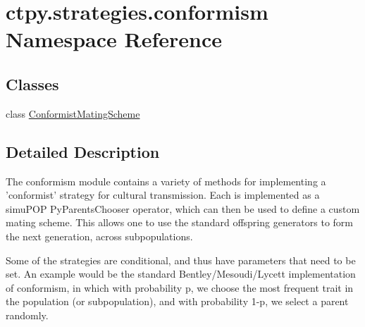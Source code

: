 \hypertarget{namespacectpy_1_1strategies_1_1conformism}{\section{ctpy.\-strategies.\-conformism Namespace Reference}
\label{namespacectpy_1_1strategies_1_1conformism}
}
\subsection*{Classes}
\begin{DoxyCompactItemize}
\item 
class \hyperlink{classctpy_1_1strategies_1_1conformism_1_1_conformist_mating_scheme}{Conformist\-Mating\-Scheme}
\end{DoxyCompactItemize}


\subsection{Detailed Description}
\begin{DoxyVerb}The conformism module contains a variety of methods for implementing a 'conformist'
strategy for cultural transmission.  Each is implemented as a simuPOP PyParentsChooser
operator, which can then be used to define a custom mating scheme.  This allows one to
use the standard offspring generators to form the next generation, across subpopulations.

Some of the strategies are conditional, and thus have parameters that need to be set.  An
example would be the standard Bentley/Mesoudi/Lycett implementation of conformism, in which
with probability p, we choose the most frequent trait in the population (or subpopulation),
and with probability 1-p, we select a parent randomly.\end{DoxyVerb}
 